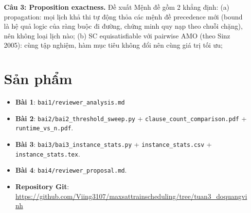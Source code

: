 \documentclass[12pt, a4paper]{article}
\begin{document}
\textbf{Câu 3: Proposition exactness.} Đề xuất Mệnh đề gồm 2 khẳng định: (a) propagation: mọi lịch khả thi tự động thỏa các mệnh đề precedence mới (bound là hệ quả logic của ràng buộc đi đường, chứng minh quy nạp theo chuỗi chặng), nên không loại lịch nào; (b) SC equisatisfiable với pairwise AMO (theo Sinz 2005): cùng tập nghiệm, hàm mục tiêu không đổi nên cùng giá trị tối ưu;

\section{Sản phẩm}
\begin{itemize}
    \item \textbf{Bài 1}: \texttt{bai1/reviewer\_analysis.md}
    \item \textbf{Bài 2}: \texttt{bai2/bai2\_threshold\_sweep.py} +
          \texttt{clause\_count\_comparison.pdf} + \\ \texttt{runtime\_vs\_n.pdf}.
    \item \textbf{Bài 3}: \texttt{bai3/bai3\_instance\_stats.py} + \texttt{instance\_stats.csv} + \\ \texttt{instance\_stats.tex}.
    \item \textbf{Bài 4}: \texttt{bai4/reviewer\_proposal.md}.
    \item \textbf{Repository Git}:
          \url{https://github.com/Viing3107/maxsattrainscheduling/tree/tuan3_doquangvinh}
\end{itemize}
\end{document}
